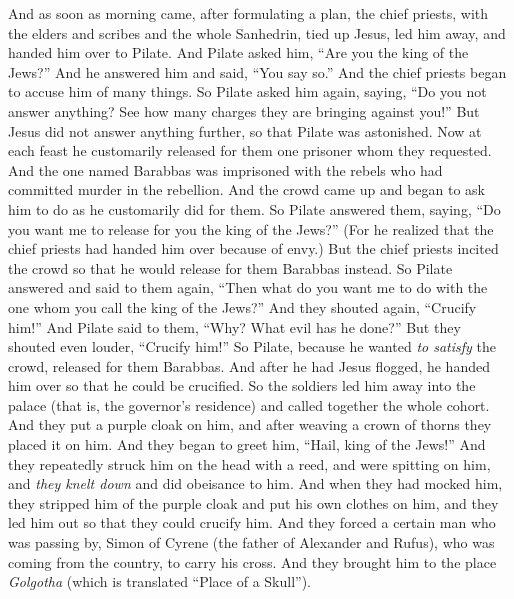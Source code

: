 \begin{biblechapter} %
 And as soon as morning came, after formulating a plan, the chief priests, with the elders and scribes and the whole Sanhedrin, tied up Jesus, led him away, and handed him over to Pilate.
\verse And Pilate asked him, “Are you the king of the Jews?” And he answered him and said, “You say so.”
\verse And the chief priests began to accuse him of many things.
\verse So Pilate asked him again, saying, “Do you not answer anything? See how many charges they are bringing against you!”
\verse But Jesus did not answer anything further, so that Pilate was astonished.
 Now at each feast he customarily released for them one prisoner whom they requested.
\verse And the one named Barabbas was imprisoned with the rebels who had committed murder in the rebellion.
\verse And the crowd came up and began to ask him to do as he customarily did for them.
\verse So Pilate answered them, saying, “Do you want me to release for you the king of the Jews?”
\verse (For he realized that the chief priests had handed him over because of envy.)
\verse But the chief priests incited the crowd so that he would release for them Barabbas instead.
\verse So Pilate answered and said to them again, “Then what do you want me to do with the one whom you call the king of the Jews?”
\verse And they shouted again, “Crucify him!”
\verse And Pilate said to them, “Why? What evil has he done?” But they shouted even louder, “Crucify him!”
\verse So Pilate, because he wanted \textit{to satisfy} the crowd, released for them Barabbas. And after he had Jesus flogged, he handed him over so that he could be crucified.
 So the soldiers led him away into the palace (that is, the governor’s residence) and called together the whole cohort.
\verse And they put a purple cloak on him, and after weaving a crown of thorns they placed it on him.
\verse And they began to greet him, “Hail, king of the Jews!”
\verse And they repeatedly struck him on the head with a reed, and were spitting on him, and \textit{they knelt down} and did obeisance to him.
\verse And when they had mocked him, they stripped him of the purple cloak and put his own clothes on him, and they led him out so that they could crucify him.
 And they forced a certain man who was passing by, Simon of Cyrene (the father of Alexander and Rufus), who was coming from the country, to carry his cross.
\verse And they brought him to the place \textit{Golgotha} (which is translated “Place of a Skull”).

\end{biblechapter}
